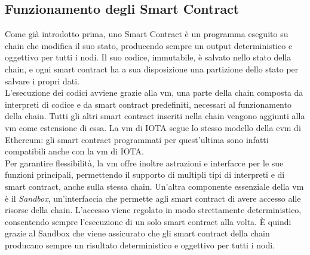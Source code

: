 \documentclass[12pt,a4paper,openright,twoside]{report}
\begin{document}
\subsection{Funzionamento degli Smart Contract}
Come già introdotto prima, uno Smart Contract è un programma eseguito su chain che modifica il suo stato, producendo sempre un output deterministico e oggettivo per tutti i nodi. Il suo codice, immutabile, è salvato nello stato della chain, e ogni smart contract ha a sua disposizione una partizione dello stato per salvare i propri dati.\\
L'esecuzione dei codici avviene grazie alla \acrfull{vm}, una parte della chain composta da interpreti di codice e da smart contract predefiniti, necessari al funzionamento della chain. Tutti gli altri smart contract inseriti nella chain vengono aggiunti alla \acrshort{vm} come estensione di essa. La \acrshort{vm} di IOTA segue lo stesso modello della \acrfull{evm} di Ethereum: gli smart contract programmati per quest'ultima sono infatti compatibili anche con la \acrshort{vm} di IOTA.\\
Per garantire flessibilità, la \acrshort{vm} offre inoltre astrazioni e interfacce per le sue funzioni principali, permettendo il supporto di multipli tipi di interpreti e di smart contract, anche sulla stessa chain. Un'altra componente essenziale della \acrshort{vm} è il \textit{Sandbox}, un'interfaccia che permette agli smart contract di avere accesso alle risorse della chain. L'accesso viene regolato in modo strettamente deterministico, consentendo sempre l'esecuzione di un solo smart contract alla volta. È quindi grazie al Sandbox che viene assicurato che gli smart contract della chain producano sempre un risultato deterministico e oggettivo per tutti i nodi.
\end{document}
